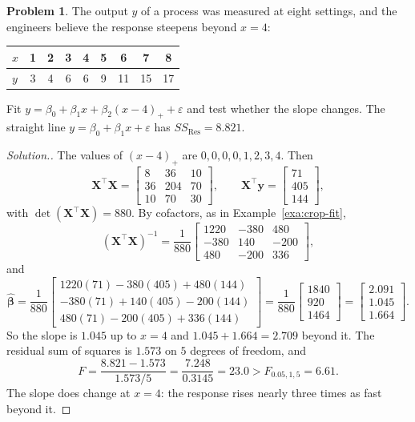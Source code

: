 \documentclass[11pt,a4paper]{article}
\numberwithin{equation}{section}
\theoremstyle{definition}
\newtheorem{problemx}{Problem}[subsection]
\newenvironment{problem}{\begin{problemx}}{\end{problemx}}
\newenvironment{solution}
  {\renewcommand{\qedsymbol}{}\begin{proof}[\textit{Solution}.]}
  {\end{proof}}
\begin{document}
\begin{problem}\label{prob:spline}
The output $y$ of a process was measured at eight settings, and the engineers believe the response steepens
beyond $x = 4$:
\begin{center}
\begin{tabular}{l|cccccccc}
$x$ & 1 & 2 & 3 & 4 & 5 & 6 & 7 & 8 \\
\hline
$y$ & 3 & 4 & 6 & 6 & 9 & 11 & 15 & 17 \\
\end{tabular}
\end{center}
Fit $y = \beta_0 + \beta_1x + \beta_2(x - 4)_+ + \varepsilon$ and test whether the slope changes. The straight line
$y = \beta_0 + \beta_1x + \varepsilon$ has $SS_{\mathrm{Res}} = 8.821$.
\end{problem}

\begin{solution}
The values of $(x - 4)_+$ are $0, 0, 0, 0, 1, 2, 3, 4$. Then
\[
\mathbf{X}^\top\mathbf{X} = \begin{bmatrix} 8 & 36 & 10 \\ 36 & 204 & 70 \\ 10 & 70 & 30 \end{bmatrix} ,
\qquad
\mathbf{X}^\top\mathbf{y} = \begin{bmatrix} 71 \\ 405 \\ 144 \end{bmatrix} ,
\]
with $\det(\mathbf{X}^\top\mathbf{X}) = 880$. By cofactors, as in Example~\ref{exa:crop-fit},
\[
(\mathbf{X}^\top\mathbf{X})^{-1} = \frac{1}{880}\begin{bmatrix} 1220 & -380 & 480 \\ -380 & 140 & -200 \\ 480 & -200 & 336 \end{bmatrix} ,
\]
and
\[
\hat{\boldsymbol\beta} = \frac{1}{880}\begin{bmatrix} 1220(71) - 380(405) + 480(144) \\ -380(71) + 140(405) - 200(144) \\ 480(71) - 200(405) + 336(144) \end{bmatrix}
= \frac{1}{880}\begin{bmatrix} 1840 \\ 920 \\ 1464 \end{bmatrix}
= \begin{bmatrix} 2.091 \\ 1.045 \\ 1.664 \end{bmatrix} .
\]
So the slope is $1.045$ up to $x = 4$ and $1.045 + 1.664 = 2.709$ beyond it. The residual sum of squares is
$1.573$ on $5$ degrees of freedom, and
\[
F = \frac{8.821 - 1.573}{1.573/5} = \frac{7.248}{0.3145} = 23.0 > F_{0.05,1,5} = 6.61 .
\]
The slope does change at $x = 4$: the response rises nearly three times as fast beyond it.
\end{solution}
\end{document}
